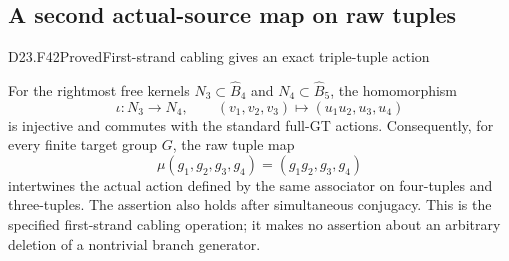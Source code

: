 \subsection{A second actual-source map on raw tuples}

\begin{statement}{D23.F42}{Proved}{First-strand cabling gives an exact triple-tuple action}
\end{statement}
For the rightmost free kernels $N_3\subset\widehat B_4$
and $N_4\subset\widehat B_5$, the homomorphism
\[
 \iota:N_3\longrightarrow N_4,\qquad
 (v_1,v_2,v_3)\longmapsto(u_1u_2,u_3,u_4)
\]
is injective and commutes with the standard full-GT actions.
Consequently, for every finite target group $G$, the raw
tuple map
\[
                   \mu(g_1,g_2,g_3,g_4)
                            =(g_1g_2,g_3,g_4)
                                                        \tag{D23.F42.1}
\]
intertwines the actual action defined by the same associator
on four-tuples and three-tuples. The assertion also holds
after simultaneous conjugacy. This is the specified
first-strand cabling operation; it makes no assertion about
an arbitrary deletion of a nontrivial branch generator.

